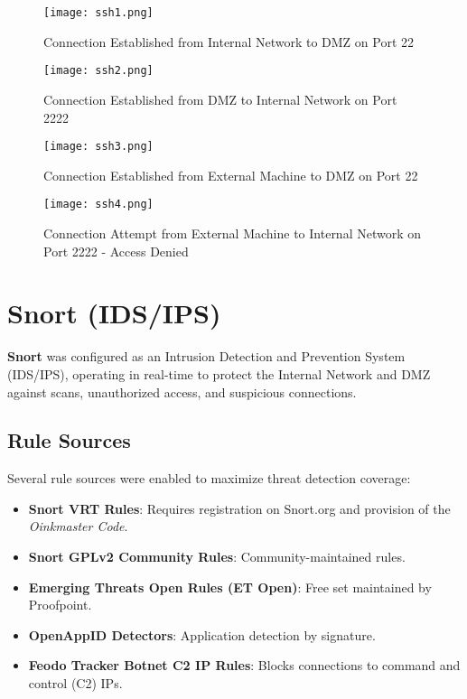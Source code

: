 \documentclass[12pt]{report}
\begin{document}
\begin{figure}[h]
    \centering
    \texttt{[image: ssh1.png]}
    \caption{Connection Established from Internal Network to DMZ on Port 22}
    \label{fig:ssh-internal-dmz}
\end{figure}

\begin{figure}[h]
    \centering
    \texttt{[image: ssh2.png]}
    \caption{Connection Established from DMZ to Internal Network on Port 2222}
    \label{fig:ssh-dmz-internal}
\end{figure}

\begin{figure}[h]
    \centering
    \texttt{[image: ssh3.png]}
    \caption{Connection Established from External Machine to DMZ on Port 22}
    \label{fig:ssh-external-dmz}
\end{figure}

\begin{figure}[h]
    \centering
    \texttt{[image: ssh4.png]}
    \caption{Connection Attempt from External Machine to Internal Network on Port 2222 - Access Denied}
    \label{fig:ssh-external-internal-blocked}
\end{figure}

\clearpage

\section*{Snort (IDS/IPS)}

\textbf{Snort} was configured as an Intrusion Detection and Prevention System (IDS/IPS), operating in real-time to protect the Internal Network and DMZ against scans, unauthorized access, and suspicious connections.

\subsection*{Rule Sources}

Several rule sources were enabled to maximize threat detection coverage:

\begin{itemize}
    \item \textbf{Snort VRT Rules}: Requires registration on Snort.org and provision of the \textit{Oinkmaster Code}.
    \item \textbf{Snort GPLv2 Community Rules}: Community-maintained rules.
    \item \textbf{Emerging Threats Open Rules (ET Open)}: Free set maintained by Proofpoint.
    \item \textbf{OpenAppID Detectors}: Application detection by signature.
    \item \textbf{Feodo Tracker Botnet C2 IP Rules}: Blocks connections to command and control (C2) IPs.
\end{itemize}
\end{document}
